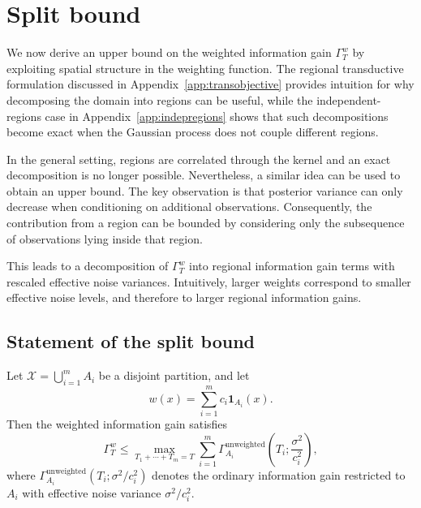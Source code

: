 \section{Split bound} \label{sec:splitbound}

We now derive an upper bound on the weighted information gain
$\Gamma_T^w$ by exploiting spatial structure in the weighting function.
The regional transductive formulation discussed in
Appendix~\ref{app:transobjective} provides intuition for why decomposing
the domain into regions can be useful, while the independent-regions case
in Appendix~\ref{app:indepregions} shows that such decompositions become
exact when the Gaussian process does not couple different regions.

In the general setting, regions are correlated through the kernel and an
exact decomposition is no longer possible. Nevertheless, a similar idea
can be used to obtain an upper bound. The key observation is that posterior
variance can only decrease when conditioning on additional observations.
Consequently, the contribution from a region can be bounded by considering
only the subsequence of observations lying inside that region.

This leads to a decomposition of $\Gamma_T^w$ into regional information
gain terms with rescaled effective noise variances. Intuitively, larger
weights correspond to smaller effective noise levels, and therefore to
larger regional information gains.

\subsection{Statement of the split bound}

\begin{proposition} \label{prop: splitbound}
Let $\mathcal{X}=\bigcup_{i=1}^m A_i$ be a disjoint partition, and let
\begin{equation*}
w(x)
=
\sum_{i=1}^m
c_i\mathbf{1}_{A_i}(x).
\end{equation*}
Then the weighted information gain satisfies
\begin{equation*}
\Gamma_T^w
\leq
\max_{T_1+\cdots+T_m=T}
\sum_{i=1}^m
\Gamma_{A_i}^{\mathrm{unweighted}}
\left(
T_i;\frac{\sigma^2}{c_i^2}
\right),
\end{equation*}
where $\Gamma_{A_i}^{\mathrm{unweighted}}(T_i;\sigma^2/c_i^2)$ denotes the ordinary information gain restricted to $A_i$ with effective noise variance $\sigma^2/c_i^2$.
\end{proposition}

